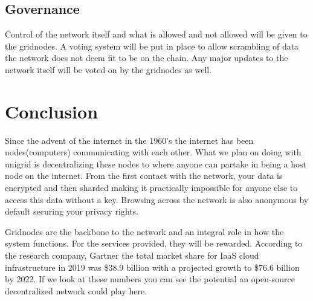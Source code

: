 \documentclass[12pt]{article}
\begin{document}
\subsection*{Governance}
Control of the network itself and what is allowed and not allowed will be given to the gridnodes. A voting system will be put in place to allow scrambling of data the network does not deem fit to be on the chain. Any major updates to the network itself will be voted on by the gridnodes as well.


\section*{Conclusion}

Since the advent of the internet in the 1960's\cite{int1997} the internet has been nodes(computers) communicating with each other. What we plan on doing with unigrid is decentralizing these nodes to where anyone can partake in being a host node on the internet. From the first contact with the network, your data is encrypted and then sharded making it practically impossible for anyone else to access this data without a key. Browsing across the network is also anonymous by default securing your privacy rights.

Gridnodes are the backbone to the network and an integral role in how the system functions. For the services provided, they will be rewarded. According to the research company, Gartner the total market share for IaaS cloud infrastructure in 2019 was \$38.9 billion with a projected growth to \$76.6 billion by 2022\cite{gartner2019}. If we look at these numbers you can see the potential an open-source decentralized network could play here.
\end{document}
